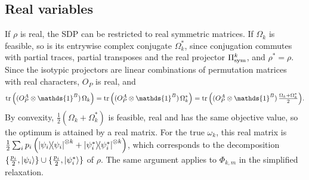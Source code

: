 \documentclass[aps,pra,twocolumn,superscriptaddress]{revtex4-2}
\newcommand{\one}{\mathds{1}}
\newcommand{\I}{\one}
\begin{document}
\begin{widetext}
\subsection{Real variables}
If $\rho$ is real, the SDP can be restricted to real symmetric matrices. If $\Omega_k$ is feasible, so is its entrywise complex conjugate $\Omega_k^*$, since conjugation commutes with partial traces, partial transposes and the real projector $\Pi_{\rm sym}^k$, and $\rho^*=\rho$. Since the isotypic projectors are linear combinations of permutation matrices with real characters, $O_P$ is real, and
\begin{equation}
    \tr\left((O_P^A \otimes \I^B)\, \Omega_k\right) = \tr\left((O_P^A \otimes \I^B)\, \Omega_k^*\right) = \tr\Big((O_P^A \otimes \I^B)\, \tfrac{\Omega_k + \Omega_k^*}{2}\Big).
\end{equation}
By convexity, $\frac12(\Omega_k+\Omega_k^*)$ is feasible, real and has the same objective value, so the optimum is attained by a real matrix. For the true $\omega_k$, this real matrix is $\frac{1}{2}\sum_i p_i \left(\dyad{\psi_i}^{\otimes k} + \dyad{\psi_i^*}^{\otimes k}\right)$, which corresponds to the decomposition $\{\frac{p_i}{2},\ket{\psi_i}\}\cup\{\frac{p_i}{2},\ket{\psi_i^*}\}$ of $\rho$. The same argument applies to $\Phi_{k,m}$ in the simplified relaxation.


\end{widetext}
\end{document}

